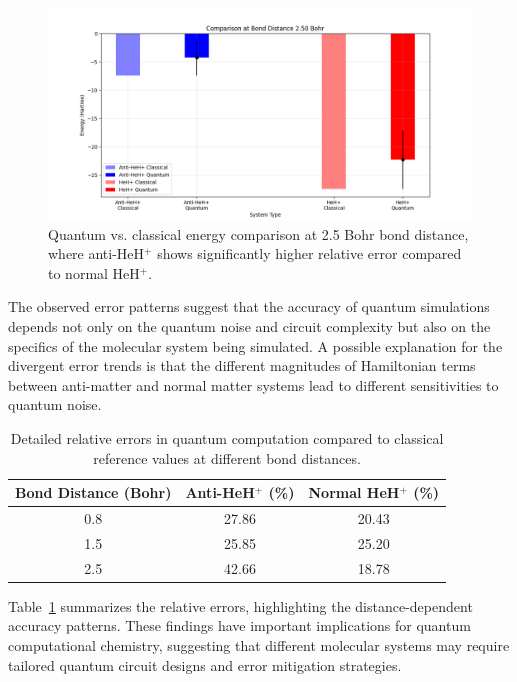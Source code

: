 \documentclass[10pt,twocolumn,a4paper]{article}
\begin{document}
\begin{figure}[t!]
    \centering
    \includegraphics[width=\columnwidth]{graphs/quantum_comparison_distance_2.50.png}
    \caption{Quantum vs. classical energy comparison at 2.5 Bohr bond distance, where anti-HeH$^+$ shows significantly higher relative error compared to normal HeH$^+$.}
    \label{fig:distance_comparison_25}
\end{figure}

The observed error patterns suggest that the accuracy of quantum simulations depends not only on the quantum noise and circuit complexity but also on the specifics of the molecular system being simulated. A possible explanation for the divergent error trends is that the different magnitudes of Hamiltonian terms between anti-matter and normal matter systems lead to different sensitivities to quantum noise.

\begin{table}[t!]
\centering
\caption{Detailed relative errors in quantum computation compared to classical reference values at different bond distances.}
\label{tab:rel_errors}
\begin{tabular}{@{}ccc@{}}
\toprule
Bond Distance (Bohr) & Anti-HeH$^+$ (\%) & Normal HeH$^+$ (\%) \\
\midrule
0.8 & 27.86 & 20.43 \\
1.5 & 25.85 & 25.20 \\
2.5 & 42.66 & 18.78 \\
\bottomrule
\end{tabular}
\end{table}

Table~\ref{tab:rel_errors} summarizes the relative errors, highlighting the distance-dependent accuracy patterns. These findings have important implications for quantum computational chemistry, suggesting that different molecular systems may require tailored quantum circuit designs and error mitigation strategies.
\end{document}
